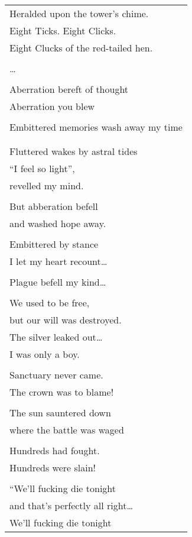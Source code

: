 \documentclass{article}
\begin{document}
\begin{center}
\begin{tabular}{l}
Heralded upon the tower's chime. \\
Eight Ticks. Eight Clicks. \\
Eight Clucks of the red-tailed hen. \\
\\
\ldots{} \\
\\
Aberration bereft of thought \\
Aberration you blew \\
\\
Embittered memories wash away my time \\
\\
\\
Fluttered wakes by astral tides \\
``I feel so light'', \\
revelled my mind. \\
\\
But abberation befell \\
and washed hope away. \\
\\
Embittered by stance \\
I let my heart recount\ldots{} \\
\\
Plague befell my kind\ldots{} \\
\\
We used to be free, \\
but our will was destroyed. \\
The silver leaked out\ldots{} \\
I was only a boy. \\
\\
Sanctuary never came. \\
The crown was to blame! \\
\\
The sun sauntered down \\
where the battle was waged \\
\\
Hundreds had fought. \\
Hundreds were slain! \\
\\
``We'll fucking die tonight \\ %
and that's perfectly all right\ldots{} \\
We'll fucking die tonight \\

\end{tabular}
\end{center}
\end{document}
